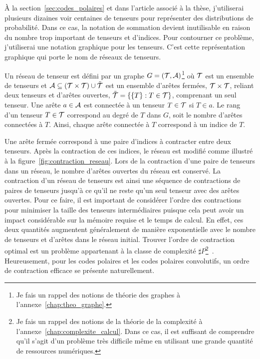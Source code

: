 À la section~\ref{sec:codes_polaires} et dans l'article associé à la thèse,
j'utiliserai plusieurs dizaines voir centaines de tenseurs pour 
représenter des distributions de probabilité.
Dans ce cas, 
la notation de sommation devient inutilisable 
en raison du nombre trop important de tenseurs et d'indices.
Pour contourner ce problème,
j'utiliserai une notation graphique pour les tenseurs.
C'est cette représentation graphique qui porte le nom de réseaux de tenseurs.

Un réseau de tenseur est défini par un graphe $G = (\mathcal{T}, \mathcal{A})$\footnote{Je fais 
un rappel des notions de théorie des graphes à l'annexe~\ref{chap:theo_graphe}.} où $\mathcal{T}$ 
est un ensemble de tenseurs et $\mathcal{A} \subseteq (\mathcal{T} \times \mathcal{T}) \cup \tilde{\mathcal{T}}$ 
est un ensemble d'arêtes fermées, $\mathcal{T} \times \mathcal{T}$, reliant deux tenseurs 
et d'arêtes ouvertes, $\tilde {\mathcal{T}} = \qty{\qty{T} : T \in \mathcal{T}}$, comprenant un seul tenseur.
Une arête $a \in \mathcal{A}$ est connectée à un tenseur $T \in \mathcal{T}$ si $T \in a$.
Le rang d'un tenseur $T \in \mathcal{T}$ correspond au degré de $T$ dans $G$,
soit le nombre d'arêtes connectées à $T$.
Ainsi, chaque arête connectée à $T$ correspond à un indice de $T$.

Une arête fermée correspond à une paire d'indices à contracter entre deux tenseurs.
Après la contraction de ces indices, le réseau est modifié comme 
illustré à la figure~\ref{fig:contraction_reseau}.
Lors de la contraction d'une paire de tenseurs dans un réseau,
le nombre d'arêtes ouvertes du réseau est conservé.
La contraction d'un réseau de tenseurs est ainsi une séquence de contractions 
de paires de tenseurs jusqu'à ce qu'il ne reste qu'un seul tenseur avec des arêtes ouvertes.
Pour ce faire, 
il est important de considérer l'ordre des contractions pour minimiser la taille 
des tenseurs intermédiaires puisque cela peut avoir un impact considérable sur la mémoire
requise et le temps de calcul.
En effet,
ces deux quantités augmentent généralement de manière exponentielle avec le nombre 
de tenseurs et d'arêtes dans le réseau initial.
Trouver l'ordre de contraction optimal est un problème appartenant 
à la classe de complexité $\sharp P$\footnote{Je fais un rappel des notions de la 
théorie de la complexité à l'annexe~\ref{chap:complexite_calcul}. Dans ce cas, 
il est suffisant de comprendre qu'il s'agit d'un problème très difficile même 
en utilisant une grande quantité de ressources numériques.}~\cite{biamonte_tensor_2015}. 
Heureusement,
pour les codes polaires et les codes polaires convolutifs,
un ordre de contraction efficace se présente naturellement.


